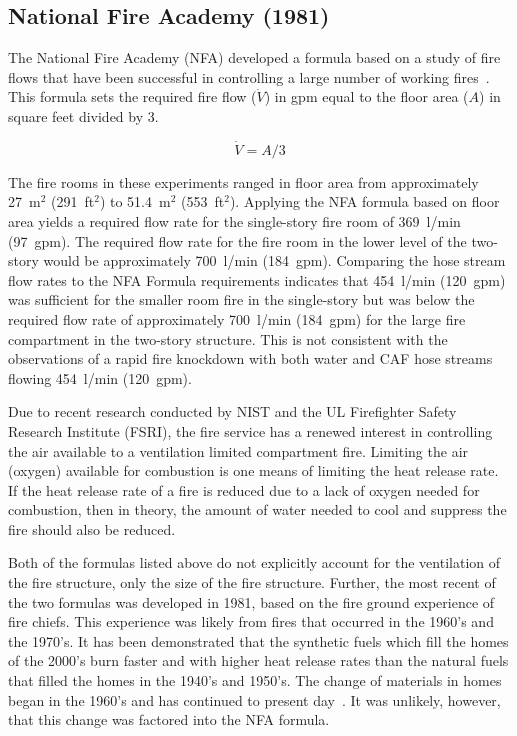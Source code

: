 \documentclass[12pt,oneside]{book}
\begin{document}
\subsection{National Fire Academy (1981)}
The National Fire Academy (NFA) developed a formula based on a study of fire flows that have been successful in controlling a large number of working fires~\cite{Klaene:1}. This formula sets the required fire flow ($\dot{V}$) in gpm equal to the floor area ($A$) in square feet divided by 3.

\begin{equation}\label{eq:nfa_form}
\dot{V} = A / 3
\end{equation}

The fire rooms in these experiments ranged in floor area from approximately 27~m$^2$ (291~ft$^2$) to 51.4~m$^2$ (553~ft$^2$). Applying the NFA formula based on floor area yields a required flow rate for the single-story fire room of 369~l/min (97~gpm). The required flow rate for the fire room in the lower level of the two-story would be approximately 700~l/min (184~gpm). Comparing the hose stream flow rates to the NFA Formula requirements indicates that 454~l/min (120~gpm) was sufficient for the smaller room fire in the single-story but was below the required flow rate of approximately 700~l/min (184~gpm) for the large fire compartment in the two-story structure. This is not consistent with the observations of a rapid fire knockdown with both water and CAF hose streams flowing 454~l/min (120~gpm). 

Due to recent research conducted by NIST and the UL Firefighter Safety Research Institute (FSRI), the fire service has a renewed interest in controlling the air available to a ventilation limited compartment fire. Limiting the air (oxygen) available for combustion is one means of limiting the heat release rate. If the heat release rate of a fire is reduced due to a lack of oxygen needed for combustion, then in theory, the amount of water needed to cool and suppress the fire should also be reduced.    

Both of the formulas listed above do not explicitly account for the ventilation of the fire structure, only the size of the fire structure. Further, the most recent of the two formulas was developed in 1981, based on the fire ground experience of fire chiefs. This experience was likely from fires that occurred in the 1960's and the 1970's. It has been demonstrated that the synthetic fuels which fill the homes of the 2000's burn faster and with higher heat release rates than the natural fuels that filled the homes in the 1940's and 1950's. The change of materials in homes began in the 1960's and has continued to present day~\cite{Kerber:2}. It was unlikely, however, that this change was factored into the NFA formula.   
\end{document}
